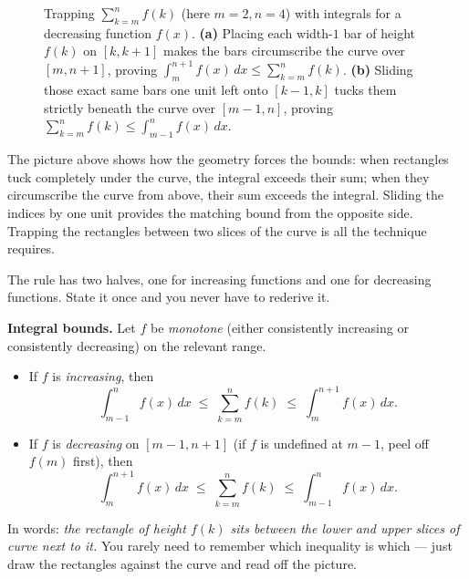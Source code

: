 \begin{figure}[H]
\caption{Trapping $\sum_{k=m}^{n} f(k)$ (here $m=2, n=4$) with integrals for a decreasing function $f(x)$.
\textbf{(a)} Placing each width-$1$ bar of height $f(k)$ on $[k, k+1]$ makes the bars circumscribe the curve over $[m, n+1]$, proving $\int_{m}^{n+1} f(x)\,dx \le \sum_{k=m}^{n} f(k)$.
\textbf{(b)} Sliding those exact same bars one unit left onto $[k-1, k]$ tucks them strictly beneath the curve over $[m-1, n]$, proving $\sum_{k=m}^{n} f(k) \le \int_{m-1}^{n} f(x)\,dx$.}
\label{ch37:fig-integral-bounds}
\end{figure}

The picture above shows how the geometry forces the bounds: when rectangles tuck
completely under the curve, the integral exceeds their sum; when they circumscribe
the curve from above, their sum exceeds the integral. Sliding the indices by one
unit provides the matching bound from the opposite side. Trapping the
rectangles between two slices of the curve is all the technique requires.

The rule has two halves, one for increasing functions and one for decreasing
functions. State it once and you never have to rederive it.

\begin{formalbox}
\textbf{Integral bounds.} Let $f$ be \emph{monotone} (either consistently increasing or consistently decreasing) on the relevant range.
\begin{itemize}
  \item If $f$ is \emph{increasing}, then
        \[
          \int_{m-1}^{n} f(x)\,dx \;\le\; \sum_{k=m}^{n} f(k) \;\le\; \int_{m}^{n+1} f(x)\,dx.
        \]
  \item If $f$ is \emph{decreasing} on $[m-1, n+1]$ (if $f$ is undefined at $m-1$, peel off $f(m)$ first), then
        \[
          \int_{m}^{n+1} f(x)\,dx \;\le\; \sum_{k=m}^{n} f(k) \;\le\; \int_{m-1}^{n} f(x)\,dx.
        \]
\end{itemize}
In words: \emph{the rectangle of height $f(k)$ sits between the lower and upper
slices of curve next to it.} You rarely need to remember which inequality is
which --- just draw the rectangles against the curve and read off the picture.
\end{formalbox}

